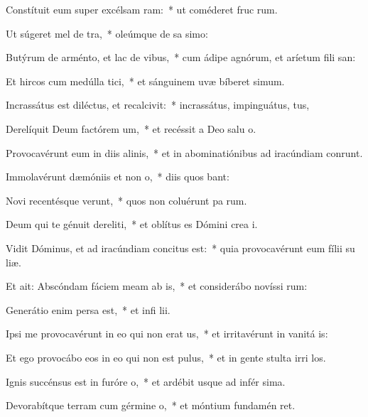 \item Constítuit eum super excélsam ram:~* ut coméderet fruc rum.
\item Ut súgeret mel de tra,~* oleúmque de sa simo:
\item Butýrum de arménto, et lac de vibus,~* cum ádipe agnórum, et aríetum fili san:
\item Et hircos cum medúlla tici,~* et sánguinem uvæ bíberet simum.
\item Incrassátus est diléctus, et recalcivit:~* incrassátus, impinguátus, tus,
\item Derelíquit Deum factórem um,~* et recéssit a Deo salu o.
\item Provocavérunt eum in diis alinis,~* et in abominatiónibus ad iracúndiam conrunt.
\item Immolavérunt dæmóniis et non o,~* diis quos bant:
\item Novi recentésque verunt,~* quos non coluérunt pa rum.
\item Deum qui te génuit dereliti,~* et oblítus es Dómini crea i.
\item \singlecolsep
\item Vidit Dóminus, et ad iracúndiam concitus est:~* quia provocavérunt eum fílii su  liæ.
\item Et ait: Abscóndam fáciem meam ab is,~* et considerábo novíssi rum:
\item Generátio enim persa est,~* et infi lii.
\item Ipsi me provocavérunt in eo qui non erat us,~* et irritavérunt in vanitá is:
\item Et ego provocábo eos in eo qui non est pulus,~* et in gente stulta irri los.
\item Ignis succénsus est in furóre o,~* et ardébit usque ad infér sima.
\item Devorabítque terram cum gérmine o,~* et móntium fundamén ret.
